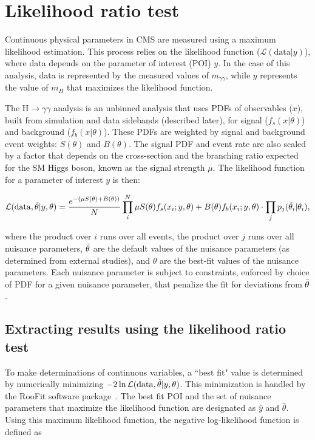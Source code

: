 \section{Likelihood ratio test}

Continuous physical parameters in CMS are measured using a maximum likelihood estimation. This process relies on the likelihood function ($\mathcal{L}(\mathrm{data}|y)$), where data depends on the parameter of interest (POI) $y$. In the case of this analysis, data is represented by the measured values of $m_{\gamma\gamma}$, while $y$ represents the value of $m_H$ that maximizes the likelihood function. 

The H$\rightarrow\gamma\gamma$ analysis is an unbinned analysis that uses PDFs of observables ($x$), built from simulation and data sidebands (described later), for signal ($f_s(x|\theta)$) and background ($f_b(x|\theta)$). These PDFs are weighted by signal and background event weights: $S(\theta)$ and $B(\theta)$. The signal PDF and event rate are also scaled by a factor that depends on the cross-section and the branching ratio expected for the SM Higgs boson, known as the signal strength $\mu$. The likelihood function for a parameter of interest $y$ is then:

\begin{equation}
    \mathcal{L}(\mathrm{data},\Tilde{\theta}| y, \theta) = \frac{e^{-(\mu S(\theta) + B(\theta))}}{N} \prod_i^N \mu S(\theta) f_s(x_i; y, \theta) + B(\theta) f_b(x_i; y, \theta) \cdot \prod_j p_j(\Tilde{\theta}_i | \theta_i),
\end{equation}

\noindent where the product over $i$ runs over all events, the product over $j$ runs over all nuisance parameters, $\Tilde{\theta}$ are the default values of the nuisance parameters (as determined from external studies), and $\theta$ are the best-fit values of the nuisance parameters. Each nuisance parameter is subject to constraints, enforced by choice of PDF for a given nuisance parameter, that penalize the fit for deviations from $\Tilde{\theta}$.

\subsection{Extracting results using the likelihood ratio test}

To make determinations of continuous variables, a ``best fit" value is determined by numerically minimizing $-2\ln\mathcal{L}(\mathrm{data},\Tilde{\theta}|y,\theta)$. This minimization is handled by the RooFit software package~\cite{roofit}. The best fit POI and the set of nuisance parameters that maximize the likelihood function are designated as $\hat{y}$ and $\hat{\theta}$. Using this maximum likelihood function, the negative log-likelihood function is defined as

